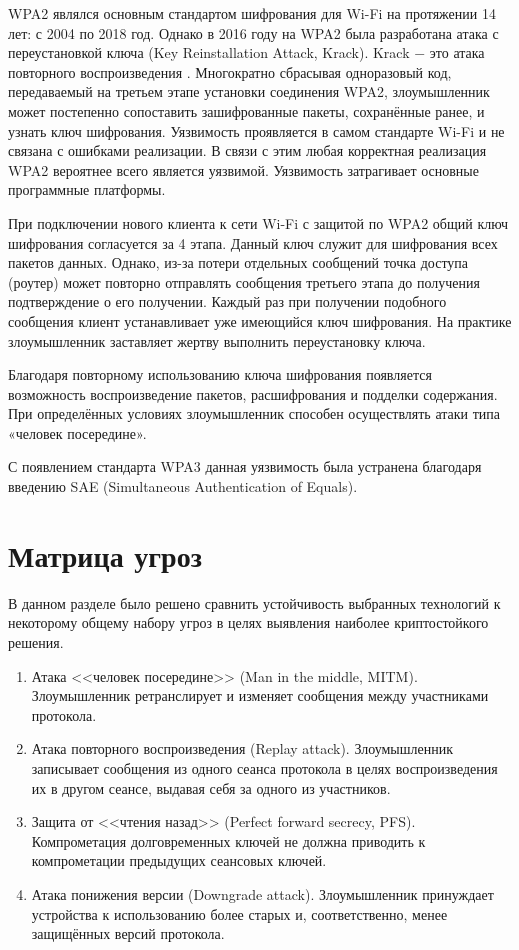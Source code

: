 	WPA2 являлся основным стандартом шифрования для Wi-Fi на протяжении 14 лет: с 2004 по 2018 год.
	Однако в 2016 году на WPA2 была разработана атака с переустановкой ключа (Key Reinstallation Attack, Krack).
	Krack $-$ это атака повторного воспроизведения \cite{cve-2017-13077}. Многократно сбрасывая одноразовый код, передаваемый 
	на третьем этапе установки соединения WPA2, злоумышленник может постепенно сопоставить зашифрованные 
	пакеты, сохранённые ранее, и узнать ключ шифрования.
	Уязвимость проявляется в самом стандарте Wi-Fi и не связана с ошибками реализации. В связи с этим любая
	корректная реализация WPA2 вероятнее всего является уязвимой. Уязвимость затрагивает основные 
	программные платформы.
	
	При подключении нового клиента к сети Wi-Fi с защитой по WPA2 общий ключ шифрования согласуется 
	за 4 этапа. Данный ключ служит для шифрования всех пакетов данных. Однако, из-за потери отдельных 
	сообщений точка доступа (роутер) может повторно отправлять сообщения третьего этапа до получения 
	подтверждение о его получении. Каждый раз при получении подобного сообщения клиент устанавливает 
	уже имеющийся ключ шифрования. На практике злоумышленник заставляет жертву выполнить переустановку
	ключа.
	
	Благодаря повторному использованию ключа шифрования появляется возможность воспроизведение пакетов, 
	расшифрования и подделки содержания. При определённых условиях злоумышленник способен осуществлять 
	атаки типа «человек посередине».
	
	С появлением стандарта WPA3 данная уязвимость была устранена благодаря введению SAE (Simultaneous 
	Authentication of Equals).
	
	
	\section{Матрица угроз}
	
	В данном разделе было решено сравнить устойчивость выбранных технологий к некоторому общему набору
	угроз в целях выявления наиболее криптостойкого решения.
	
	\begin{enumerate}
		\item Атака <<человек посередине>> (Man in the middle, MITM). Злоумышленник ретранслирует и 
		изменяет сообщения между участниками протокола.
		\item Атака повторного воспроизведения (Replay attack). Злоумышленник записывает сообщения
		из одного сеанса протокола в целях воспроизведения их в другом сеансе, выдавая себя за одного
		из участников.
		\item Защита от <<чтения назад>> (Perfect forward secrecy, PFS). Компрометация долговременных ключей 
		не должна приводить к компрометации предыдущих сеансовых ключей.
		\item Атака понижения версии (Downgrade attack). Злоумышленник принуждает устройства к
		использованию более старых и, соответственно, менее защищённых версий протокола.
	\end{enumerate}

